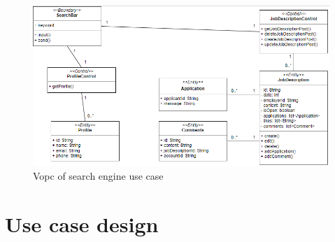 \documentclass[a4paper]{article}
\begin{document}
\begin{figure}[H]
    \centering
    \includegraphics[width=1.0\textwidth]{vopc_search_engine.png}
    \caption{Vopc of search engine use case}
    \label{fig:fig31}
\end{figure}

\pagebreak
\section{Use case design}
\end{document}
